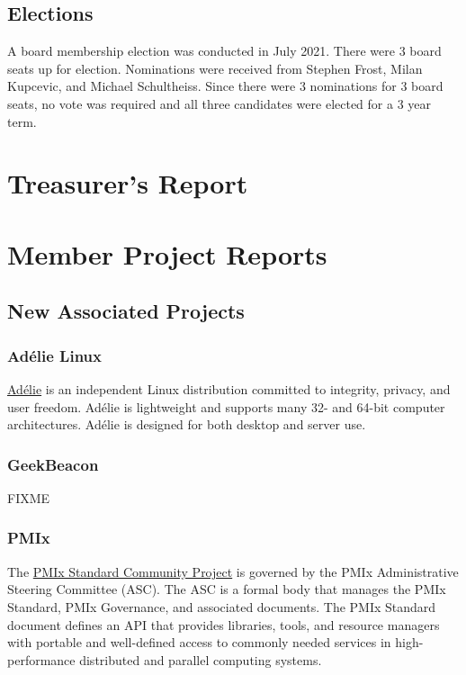 \documentclass[a4paper]{report}
\begin{document}
\section{Elections}

A board membership election was conducted in July 2021.  There were 3 board seats up for election.  Nominations were received from Stephen Frost, Milan Kupcevic, and Michael Schultheiss.  Since there were 3 nominations for 3 board seats, no vote was required and all three candidates were elected for a 3 year term.

\chapter{Treasurer's Report}

\chapter{Member Project Reports}

\section{New Associated Projects}

\subsection{Adélie Linux}

\href{https://www.adelielinux.org/}{Adélie} is an independent Linux distribution committed to integrity, privacy, and user freedom.  Adélie is lightweight and supports many 32- and 64-bit computer architectures. Adélie is designed for both desktop and server use.

\subsection{GeekBeacon}

FIXME

\subsection{PMIx}

The \href{https://pmix.org/}{PMIx Standard Community Project} is governed by the PMIx Administrative Steering Committee (ASC). The ASC is a formal body that manages the PMIx Standard, PMIx Governance, and associated documents. The PMIx Standard document defines an API that provides libraries, tools, and resource managers with portable and well-defined access to commonly needed services in high-performance distributed and parallel computing systems.
\end{document}
